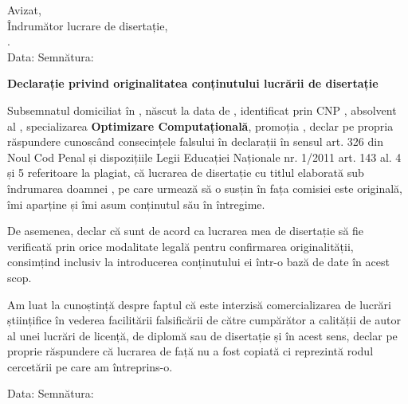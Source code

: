 \vspace*{\fill}

\begin{flushright}
    Avizat, \\
    Îndrumător lucrare de disertație, \\
    \coordinator. \\
    Data: \dottedline \hspace{1cm} Semnătura: \dottedline
\end{flushright}

\vspace{1cm}
\begin{center}
    \large
    \textbf{Declarație privind originalitatea conținutului lucrării de disertație}
\end{center}

Subsemnatul \textbf{\authornamelf} domiciliat în \textbf{\authoraddress}, născut la data de \textbf{\authorbirth}, identificat prin CNP \textbf{\authorcnp}, absolvent al \textbf{\universitygro}, \textbf{\facultyro} specializarea \textbf{Optimizare Computațională}, promoția \textbf{\promotion}, declar pe propria răspundere cunoscând consecințele falsului în declarații în sensul art. 326 din Noul Cod Penal și dispozițiile Legii Educației Naționale nr. 1/2011 art. 143 al. 4 și 5 referitoare la plagiat, că lucrarea de disertație cu titlul \textbf{\thesistitle} elaborată sub îndrumarea doamnei \textbf{\coordinator}, pe care urmează să o susțin în fața comisiei este originală, îmi aparține și îmi asum conținutul său în întregime.

De asemenea, declar că sunt de acord ca lucrarea mea de disertație să fie verificată prin orice modalitate legală pentru confirmarea originalității, consimțind inclusiv la introducerea conținutului ei într-o bază de date în acest scop.

Am luat la cunoștință despre faptul că este interzisă comercializarea de lucrări științifice în vederea facilitării falsificării de către cumpărător a calității de autor al unei lucrări de licență, de diplomă sau de disertație și în acest sens, declar pe proprie răspundere că lucrarea de față nu a fost copiată ci reprezintă rodul cercetării pe care am întreprins-o.

\begin{flushright}
    Data: \dottedline \hspace{6cm} Semnătura: \dottedline
\end{flushright}

\vspace*{\fill}
\pagebreak